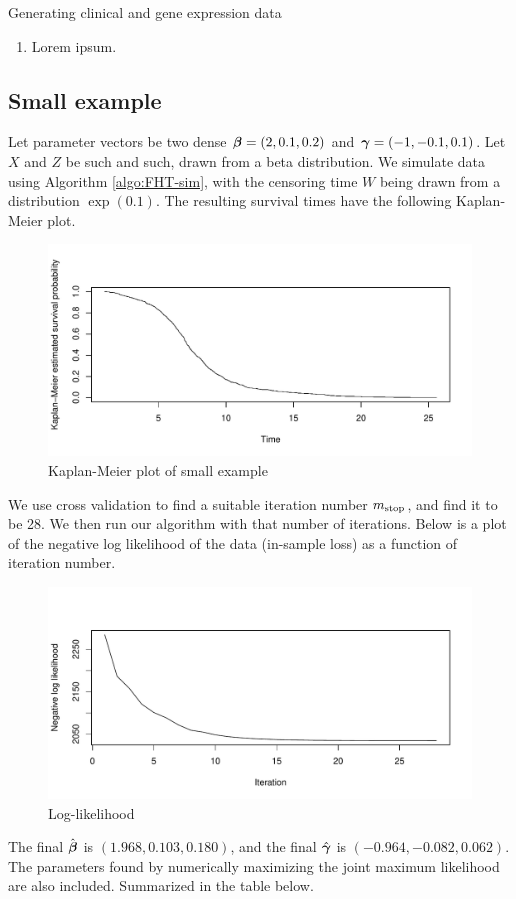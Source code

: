 \begin{algorithm}
\caption{Generating clinical and gene expression data}
\label{algo:clinical-sim}
\begin{enumerate}
    \item Lorem ipsum.
\end{enumerate}
\end{algorithm}

\subsection{Small example}
Let parameter vectors be two dense $\boldsymbol{\beta}=(2,0.1,0.2)$ and $\boldsymbol{\gamma}=(-1, -0.1, 0.1)$. Let $X$ and $Z$ be such and such, drawn from a beta distribution.
We simulate data using Algorithm \ref{algo:FHT-sim}, with the censoring time $W$ being drawn from a distribution $\exp(0.1)$. The resulting survival times have the following Kaplan-Meier plot.
\begin{figure}
\caption{Kaplan-Meier plot of small example}
\centering\includegraphics[scale=0.4]{figures/case1.pdf}
\end{figure}
We use cross validation to find a suitable iteration number $m_{\text{stop}}$, and find it to be 28. We then run our algorithm with that number of iterations. Below is a plot of the negative log likelihood of the data (in-sample loss) as a function of iteration number.
\begin{figure}
\caption{Log-likelihood}
\centering\includegraphics[scale=0.4]{figures/case1_loglik.pdf}
\end{figure}
The final $\hat{\boldsymbol{\beta}}$ is $(1.968, 0.103, 0.180)$, and the final $\hat{\boldsymbol{\gamma}}$ is $(-0.964, -0.082, 0.062)$. The parameters found by numerically maximizing the joint maximum likelihood are also included. Summarized in the table below.

